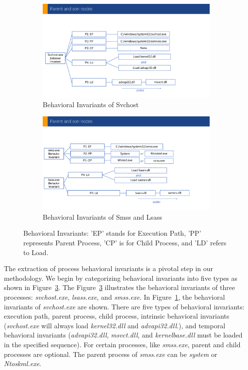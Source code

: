 \begin{figure}[h]
  \begin{subfigure}{.45\textwidth}
      \includegraphics[width=\textwidth]{figs/cons-svchost.pdf}
      \caption{Behavioral Invariants of Svchost}
      \label{fig:cons-svchost}
  \end{subfigure}
  \hfill
  \begin{subfigure}{.5\textwidth}
      \includegraphics[width=\textwidth]{figs/cons-smss-lsass.pdf}
      \caption{Behavioral Invariants of Smss and Lsass}
      \label{fig:cons-smss-lsass}
  \end{subfigure}
  \hfill
  \caption{Behavioral Invariants: 'EP' stands for Execution Path, 'PP' represents Parent Process, 'CP' is for Child Process, and 'LD' refers to Load.}
  \label{fig:cons-def}
 \end{figure}

The extraction of process behavioral invariants is a pivotal step in our methodology. We begin by categorizing behavioral invariants into five types as shown in Figure~\ref{fig:cons-def}.
The Figure~\ref{fig:cons-def} illustrates the behavioral invariants of three processes: \textit{svchost.exe}, \textit{lsass.exe}, and \textit{smss.exe}. In Figure~\ref{fig:cons-svchost}, the behavioral invariants of \textit{svchost.exe} are shown. There are five types of behavioral invariants: execution path, parent process, child process, intrinsic behavioral invariants (\textit{svchost.exe} will always load \textit{kernel32.dll} and \textit{advapi32.dll}.), and temporal behavioral invariants (\textit{advapi32.dll}, \textit{msvct.dll}, and \textit{kernelbase.dll} must be loaded in the specified sequence).
For certain processes, like \textit{smss.exe}, parent and child processes are optional. The parent process of \textit{smss.exe} can be \textit{system} or \textit{Ntoskml.exe}.

